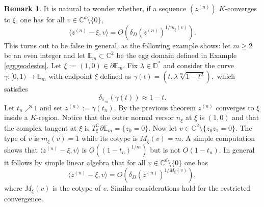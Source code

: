 \documentclass[11pt, reqno]{amsart}
\numberwithin{equation}{section}
\theoremstyle{definition}
\newtheorem{remark}[theorem]{Remark}
\newcommand{\C}{\mathbb{C}}
\newcommand{\D}{\mathbb{D}}
\begin{document}
{{		
		\begin{remark}\label{typevscotype} It is natural to wonder whether, if a sequence $(z^{(n)})$ $K$-converges to $\xi$, one has for all $v\in \C^d\setminus\{0\}$,
			$$\langle z^{(n)}-\xi,v\rangle=O\left(\delta_D(z^{(n)})^{1/m_\xi(v)}\right).$$
			This turns out to be false in general, as the following example shows: 
			let $m\geq2$ be an even integer and  let $\mathbb{E}_m\subset \C^2$ be the egg domain defined in Example \ref{egggeodesics}. Let $\xi:=(1,0)\in\partial\mathbb{E}_m$. Fix $\lambda\in\D^{*}$ and consider the curve $\gamma\colon [0,1)\to\mathbb{E}_m $
			with endpoint $\xi$ defined as  $\gamma(t)=(t,\lambda\sqrt[m]{1-t^2}),$ which satisfies
			$$\delta_{\mathbb{E}_m}(\gamma(t))\approx1-t.$$
			Let $t_n\nearrow 1$ and set $z^{(n)}:=\gamma(t_n).$ By the previous theorem   $z^{(n)}$ converges to $\xi$ inside a $K$-region.
			Notice that the outer normal versor $n_\xi$ at $\xi$ is $(1,0)$ and that the complex tangent at $\xi$ is $T_\xi^\C\partial \mathbb{E}_m=\{z_0=0\}$.
			Now let $v\in\C^2\setminus\{z_0z_1=0\}$. The type of $v$ is  $m_\xi(v)=1$ while its cotype  is $M_\xi(v)=m$.
			A simple computation shows that
			$\langle z^{(n)}-\xi,v \rangle$ is  $O((1-t_n)^{1/m})$ but is not $O(1-t_n)$.
			In general it follows by simple linear algebra that for all $v\in \C^d\setminus\{0\}$ one has
			$$\langle z^{(n)}-\xi,v\rangle=O\left(\delta_D(z^{(n)})^{1/M_\xi(v)}\right),$$
			where $M_\xi(v)$ is the cotype of $v$.
			Similar considerations hold for the restricted convergence.
		\end{remark}
		
}}
\end{document}
